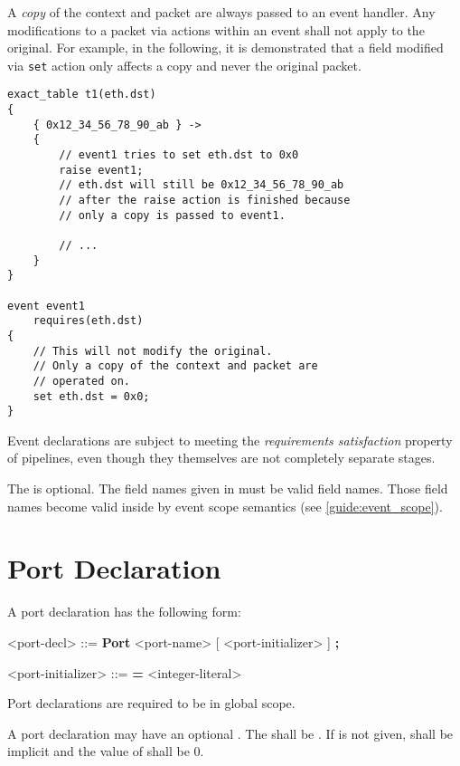 A \textit{copy} of the context  and packet are always passed to an event handler. Any modifications to a packet via actions within an event shall not apply to the original. For example, in the following, it is demonstrated that a field modified via \texttt{set} action only affects a copy and never the original packet.

\begin{minip}
\begin{lstlisting}
exact_table t1(eth.dst)
{
	{ 0x12_34_56_78_90_ab } ->
	{
		// event1 tries to set eth.dst to 0x0
		raise event1;
		// eth.dst will still be 0x12_34_56_78_90_ab
		// after the raise action is finished because
		// only a copy is passed to event1.
		
		// ...
	}
}

event event1
	requires(eth.dst)
{
	// This will not modify the original.
	// Only a copy of the context and packet are
	// operated on.
	set eth.dst = 0x0;
}
\end{lstlisting}
\end{minip}

Event declarations are subject to meeting the \textit{requirements satisfaction} property of pipelines, even though they themselves are not completely separate stages.

The  is optional. The field names given in  must be valid field names. Those field names become valid inside  by event scope semantics (see \ref{guide:event_scope}).

\section{Port Declaration} \label{guide:port}

A port declaration has the following form:

\begin{minip}
\begin{grammar}
<port-decl> ::=
\textbf{Port} <port-name> [ <port-initializer> ] \textbf{;}

<port-initializer> ::= \textbf{=} <integer-literal>
\end{grammar}
\end{minip}

Port declarations are required to be in global scope.

A port declaration may have an optional . The  shall be . If  is not given,  shall be implicit and the value of  shall be 0.

